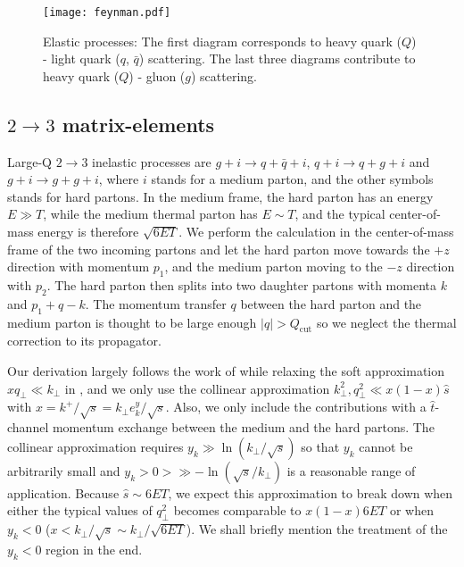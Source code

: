 \begin{appendices}
\begin{figure}
\singlespacing
\texttt{[image: feynman.pdf]}
\caption[Elastic processes: The first diagram corresponds to heavy quark]{Elastic processes: The first diagram corresponds to heavy quark ($Q$) - light quark ($q$, $\bar{q}$) scattering. The last three diagrams contribute to heavy quark ($Q$) - gluon ($g$) scattering.}\label{plots:feyn-elastic}
\end{figure}

\subsection{$2\rightarrow 3$ matrix-elements}
Large-Q $2\rightarrow 3$ inelastic processes are $g + i \rightarrow q+\bar{q} + i$, $q+i\rightarrow q+g+i$ and $g+i\rightarrow g+g+i$, where $i$ stands for a medium parton, and the other symbols stands for hard partons.
In the medium frame, the hard parton has an energy $E\gg T$, while the medium thermal parton has $E\sim T$, and the typical center-of-mass energy is therefore $\sqrt{6ET}$.
We perform the calculation in the center-of-mass frame of the two incoming partons and let the hard parton move towards the $+z$ direction with momentum $p_1$, and the medium parton moving to the $-z$ direction with $p_2$.
The hard parton then splits into two daughter partons with momenta $k$ and $p_1 + q - k$.
The momentum transfer $q$ between the hard parton and the medium parton is thought to be large enough $|q| > Q_{\textrm{cut}}$ so we neglect the thermal correction to its propagator.

Our derivation largely follows the work of \cite{Fochler:2013epa} while relaxing the soft approximation $xq_\perp \ll k_\perp$ in \cite{Fochler:2013epa}, and we only use the collinear approximation $k_\perp^2, q_\perp^2 \ll x(1-x) \hat{s}$ with $x = k^+/\sqrt{s} = k_\perp e^y_k /\sqrt{s}$.
Also, we only include the contributions with a $\hat{t}$-channel momentum exchange between the medium and the hard partons.
The collinear approximation requires $y_k \gg \ln(k_\perp/\sqrt{s})$ so that $y_k$ cannot be arbitrarily small and $y_k>0>\gg -\ln(\sqrt{s}/k_\perp)$ is a reasonable range of application.
Because $\hat{s}\sim 6 ET$, we expect this approximation to break down when either the typical values of $q_\perp^2$ becomes comparable to $x(1-x)6ET$ or when $y_k<0$ ($x < k_\perp/\sqrt{s} \sim k_\perp/\sqrt{6ET}$).
We shall briefly mention the treatment of the $y_k<0$ region in the end.


\end{appendices}
